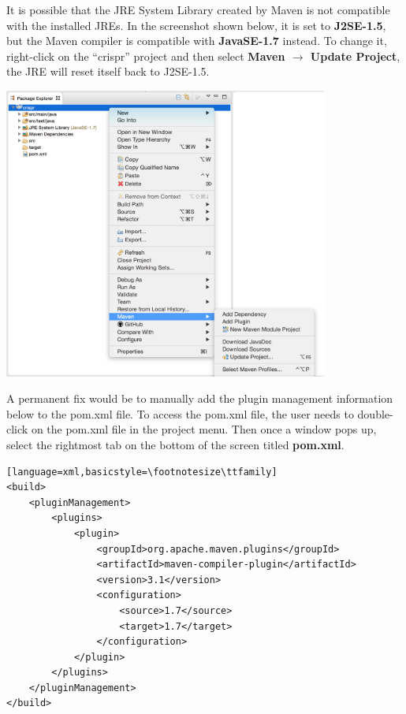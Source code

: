 It is possible that the JRE System Library created by Maven is not compatible with the installed JREs. In the screenshot shown below, it is set to {\bf J2SE-1.5}, but the Maven compiler is compatible with {\bf JavaSE-1.7} instead. To change it, right-click on the ``crispr'' project and then select {\bf Maven $\rightarrow$  Update Project}, the JRE will reset itself back to J2SE-1.5. 
\begin{center}
  \includegraphics[width=0.8\textwidth]{figures/createNewMavenProject10}
\end{center}

A permanent fix would be to manually add the plugin management information below to the pom.xml file. To access the pom.xml file, the user needs to double-click on the pom.xml file in the project menu. Then once a window pops up, select the rightmost tab on the bottom of the screen titled {\bf pom.xml}. 

\begin{minipage}{\textwidth}
\pagestyle{empty}
\begin{lstlisting}
[language=xml,basicstyle=\footnotesize\ttfamily]
<build>
    <pluginManagement>
        <plugins>
            <plugin>
                <groupId>org.apache.maven.plugins</groupId>
                <artifactId>maven-compiler-plugin</artifactId>
                <version>3.1</version>
                <configuration>
                    <source>1.7</source>
                    <target>1.7</target>
                </configuration>
            </plugin>
        </plugins>
    </pluginManagement>
</build>
\end{lstlisting}
\pagestyle{empty}
\end{minipage}

